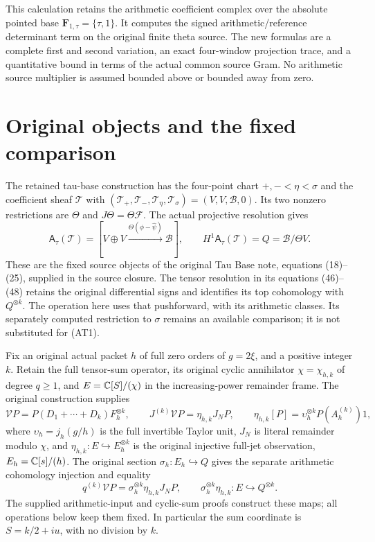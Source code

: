 This calculation retains the arithmetic coefficient complex over the
absolute pointed base $\mathbf F_{1,\tau}=\{\tau,1\}$. It computes the
signed arithmetic/reference determinant term on the original finite
theta source. The new formulas are a complete first and second variation,
an exact four-window projection trace, and a quantitative bound in terms
of the actual common source Gram. No arithmetic source multiplier is
assumed bounded above or bounded away from zero.

\section{Original objects and the fixed comparison}

The retained tau-base construction has the four-point chart
$+,-<\eta<\sigma$ and the coefficient sheaf $\mathcal T$ with
$(\mathcal T_+,\mathcal T_-,\mathcal T_\eta,\mathcal T_\sigma)
=(V,V,\mathscr B,0)$. Its two nonzero restrictions are $\Theta$ and
$J\Theta=\Theta\mathcal F$. The actual projective resolution gives
\[
 \mathsf A_\tau(\mathcal T)
 =[V\oplus V\xrightarrow{\Theta(\phi-\widehat\psi)}\mathscr B],
 \qquad H^1\mathsf A_\tau(\mathcal T)=Q=\mathscr B/\Theta V.
 \tag{AT1}
\]
These are the fixed source objects of the original Tau Base note,
equations (18)--(25), supplied in the source closure. The tensor
resolution in its equations (46)--(48) retains the original differential
signs and identifies its top cohomology with $Q^{\otimes k}$.
The operation here uses that pushforward, with its arithmetic classes.
Its separately computed restriction to $\sigma$ remains an available
comparison; it is not substituted for (AT1).

Fix an original actual packet $h$ of full zero orders of $g=2\xi$,
and a positive integer $k$. Retain the full tensor-sum operator,
its original cyclic annihilator $\chi=\chi_{h,k}$ of degree $q\ge1$,
and $E=\mathbb{C}[S]/(\chi)$ in the increasing-power remainder frame.
The original construction supplies
\[
 \mathcal V P=P(D_1+\cdots+D_k)F_h^{\otimes k},\qquad
 J^{(k)}\mathcal V P=\eta_{h,k}J_NP,\qquad
 \eta_{h,k}[P]=\upsilon_h^{\otimes k}P(A_h^{(k)})1,
 \tag{AT2}
\]
where $\upsilon_h=j_h(g/h)$ is the full invertible Taylor unit,
$J_N$ is literal remainder modulo $\chi$, and
$\eta_{h,k}:E\hookrightarrow E_h^{\otimes k}$ is the original
injective full-jet observation, $E_h=\mathbb{C}[s]/(h)$.
The original section $\sigma_h:E_h\hookrightarrow Q$ gives the
separate arithmetic cohomology injection and equality
\[
 q^{(k)}\mathcal V P=\sigma_h^{\otimes k}\eta_{h,k}J_NP,
 \qquad \sigma_h^{\otimes k}\eta_{h,k}:E\hookrightarrow Q^{\otimes k}.
 \tag{AT2a}
\]
The supplied arithmetic-input and cyclic-sum proofs construct these
maps; all operations below keep them fixed. In
particular the sum coordinate is $S=k/2+iu$, with no division by $k$.

